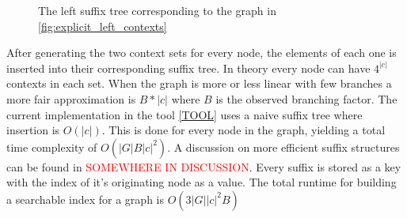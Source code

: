 \documentclass{article}
\begin{document}
\par\noindent
\begin{wrapfigure}{l}{0.49\textwidth}
	\begin{mdframed}
	\end{mdframed}
	\caption{The left suffix tree corresponding to the graph in \ref{fig:explicit_left_contexts}}
	\label{fig:left_suffix_tree}
\end{wrapfigure}
After generating the two context sets for every node, the elements of each one is inserted into their corresponding suffix tree. In theory every node can have $4^{|c|}$ contexts in each set. When the graph is more or less linear with few branches a more fair approximation is $B*|c|$ where $B$ is the observed branching factor. The current implementation in the tool \ref{TOOL} uses a naive suffix tree where insertion is $O(|c|)$. This is done for every node in the graph, yielding a total time complexity of $O(|G|B|c|^2)$. A discussion on more efficient suffix structures can be found in \textcolor{red}{SOMEWHERE IN DISCUSSION}. Every suffix is stored as a key with the index of it's originating node as a value. The total runtime for building a searchable index for a graph is $O(3|G||c|^2B)$
\end{document}

